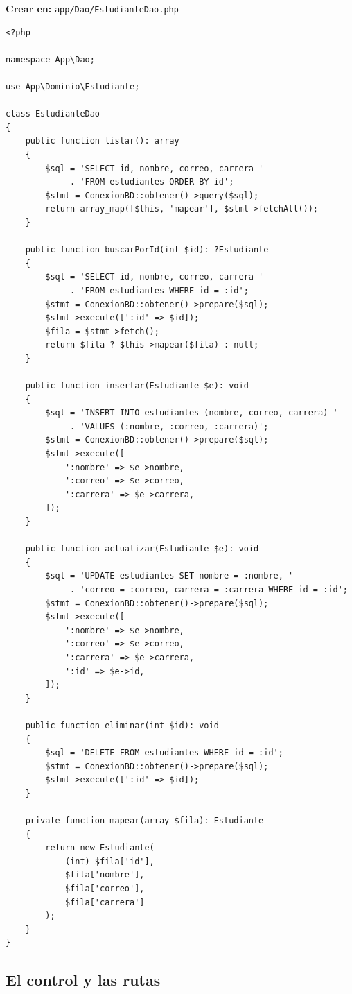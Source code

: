 {\small\textbf{Crear en:} \texttt{app/Dao/EstudianteDao.php}}
\begin{lstlisting}[style=php,caption={EstudianteDao.php (CRUD con PDO, sin Eloquent)},label={lst:lv-dao}]
<?php

namespace App\Dao;

use App\Dominio\Estudiante;

class EstudianteDao
{
    public function listar(): array
    {
        $sql = 'SELECT id, nombre, correo, carrera '
             . 'FROM estudiantes ORDER BY id';
        $stmt = ConexionBD::obtener()->query($sql);
        return array_map([$this, 'mapear'], $stmt->fetchAll());
    }

    public function buscarPorId(int $id): ?Estudiante
    {
        $sql = 'SELECT id, nombre, correo, carrera '
             . 'FROM estudiantes WHERE id = :id';
        $stmt = ConexionBD::obtener()->prepare($sql);
        $stmt->execute([':id' => $id]);
        $fila = $stmt->fetch();
        return $fila ? $this->mapear($fila) : null;
    }

    public function insertar(Estudiante $e): void
    {
        $sql = 'INSERT INTO estudiantes (nombre, correo, carrera) '
             . 'VALUES (:nombre, :correo, :carrera)';
        $stmt = ConexionBD::obtener()->prepare($sql);
        $stmt->execute([
            ':nombre' => $e->nombre,
            ':correo' => $e->correo,
            ':carrera' => $e->carrera,
        ]);
    }

    public function actualizar(Estudiante $e): void
    {
        $sql = 'UPDATE estudiantes SET nombre = :nombre, '
             . 'correo = :correo, carrera = :carrera WHERE id = :id';
        $stmt = ConexionBD::obtener()->prepare($sql);
        $stmt->execute([
            ':nombre' => $e->nombre,
            ':correo' => $e->correo,
            ':carrera' => $e->carrera,
            ':id' => $e->id,
        ]);
    }

    public function eliminar(int $id): void
    {
        $sql = 'DELETE FROM estudiantes WHERE id = :id';
        $stmt = ConexionBD::obtener()->prepare($sql);
        $stmt->execute([':id' => $id]);
    }

    private function mapear(array $fila): Estudiante
    {
        return new Estudiante(
            (int) $fila['id'],
            $fila['nombre'],
            $fila['correo'],
            $fila['carrera']
        );
    }
}
\end{lstlisting}

\subsection{El control y las rutas}
\label{ap:crud:laravel:control}

